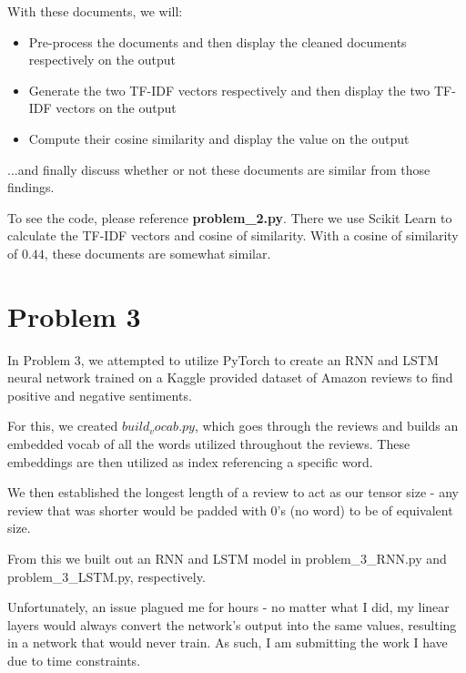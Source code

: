 \documentclass{article}
\begin{document}
With these documents, we will:

\begin{itemize}
    \item Pre-process the documents and then display the cleaned documents respectively on the output
    \item Generate the two TF-IDF vectors respectively and then display the two TF-IDF vectors on the output
    \item Compute their cosine similarity and display the value on the output
\end{itemize}

\noindent ...and finally discuss whether or not these documents are similar from those findings.

To see the code, please reference \textbf{problem\_2.py}. There we use Scikit Learn to calculate the TF-IDF vectors and cosine of similarity. With a cosine of similarity of $0.44$, these documents are somewhat similar.

\section*{Problem 3}

In Problem 3, we attempted to utilize PyTorch to create an RNN and LSTM neural network trained on a Kaggle provided dataset of Amazon reviews to find positive and negative sentiments.

For this, we created $build_vocab.py$, which goes through the reviews and builds an embedded vocab of all the words utilized throughout the reviews. These embeddings are then utilized as index referencing a specific word.

We then established the longest length of a review to act as our tensor size - any review that was shorter would be padded with 0's (no word) to be of equivalent size.

From this we built out an RNN and LSTM model in problem\_3\_RNN.py and problem\_3\_LSTM.py, respectively.

Unfortunately, an issue plagued me for hours - no matter what I did, my linear layers would always convert the network's output into the same values, resulting in a network that would never train. As such, I am submitting the work I have due to time constraints.
\end{document}

